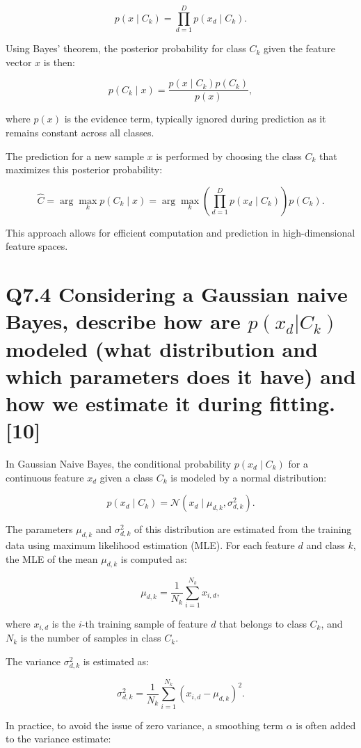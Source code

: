 \documentclass[11pt]{article}
\begin{document}
\[
p(x \mid C_k) = \prod_{d=1}^{D} p(x_d \mid C_k).
\]

Using Bayes' theorem, the posterior probability for class \( C_k \) given the feature vector \( x \) is then:

\[
p(C_k \mid x) = \frac{p(x \mid C_k) p(C_k)}{p(x)},
\]

where \( p(x) \) is the evidence term, typically ignored during prediction as it remains constant across all classes.

The prediction for a new sample \( x \) is performed by choosing the class \( C_k \) that maximizes this posterior probability:

\[
\hat{C} = \arg\max_k p(C_k \mid x) = \arg\max_k \left( \prod_{d=1}^{D} p(x_d \mid C_k) \right) p(C_k).
\]

This approach allows for efficient computation and prediction in high-dimensional feature spaces.

\section{Q7.4 Considering a Gaussian naive Bayes, describe how are $p(x_d|C_k)$ modeled (what distribution and which parameters does it have) and how we estimate it during fitting. [10]}

In Gaussian Naive Bayes, the conditional probability \( p(x_d \mid C_k) \) for a continuous feature \( x_d \) given a class \( C_k \) is modeled by a normal distribution:

\[
p(x_d \mid C_k) = \mathcal{N}(x_d \mid \mu_{d,k}, \sigma_{d,k}^2).
\]

The parameters \( \mu_{d,k} \) and \( \sigma_{d,k}^2 \) of this distribution are estimated from the training data using maximum likelihood estimation (MLE). For each feature \( d \) and class \( k \), the MLE of the mean \( \mu_{d,k} \) is computed as:

\[
\mu_{d,k} = \frac{1}{N_k} \sum_{i=1}^{N_k} x_{i,d},
\]

where \( x_{i,d} \) is the \( i \)-th training sample of feature \( d \) that belongs to class \( C_k \), and \( N_k \) is the number of samples in class \( C_k \).

The variance \( \sigma_{d,k}^2 \) is estimated as:

\[
\sigma_{d,k}^2 = \frac{1}{N_k} \sum_{i=1}^{N_k} (x_{i,d} - \mu_{d,k})^2.
\]

In practice, to avoid the issue of zero variance, a smoothing term \( \alpha \) is often added to the variance estimate:
\end{document}
